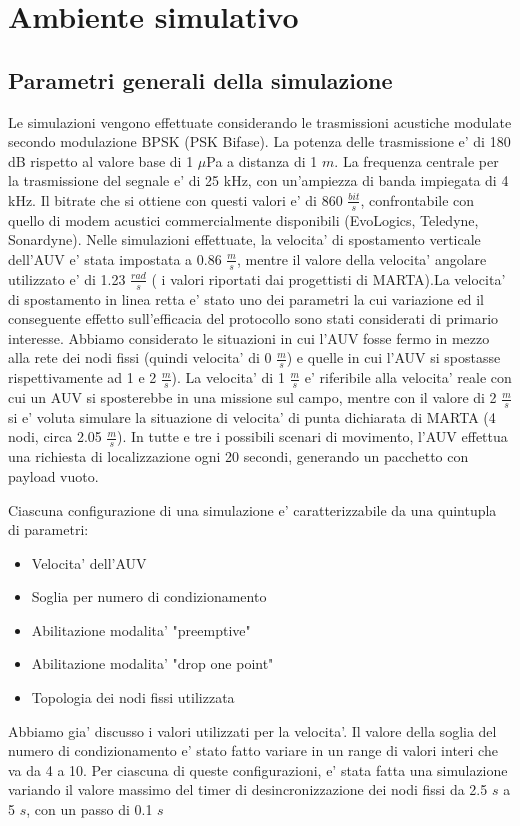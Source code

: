 \documentclass[Lau,binding=0.6cm]{sapthesis}
\begin{document}
\section{Ambiente simulativo}

\subsection{Parametri generali della simulazione}
\par
Le simulazioni vengono effettuate considerando le trasmissioni acustiche modulate secondo modulazione BPSK (PSK Bifase). La potenza delle trasmissione e' di 180 dB rispetto al valore base di 1 $\mu$Pa a distanza di 1 $m$. La frequenza centrale per la trasmissione del segnale e' di 25 kHz, con un'ampiezza di banda impiegata di 4 kHz. Il bitrate che si ottiene con questi valori e' di 860 $\frac{bit}{s}$, confrontabile con quello di modem acustici commercialmente disponibili (EvoLogics, Teledyne, Sonardyne).
Nelle simulazioni effettuate, la velocita' di spostamento verticale dell'AUV e' stata impostata a 0.86 \(\frac{m}{s}\), mentre il valore della velocita' angolare utilizzato e' di 1.23 \(\frac{rad}{s}\) ( i valori riportati dai progettisti di MARTA).\newline La velocita' di spostamento in linea retta e' stato uno dei parametri la cui variazione ed il conseguente effetto sull'efficacia del protocollo sono stati considerati di primario interesse. Abbiamo considerato le situazioni in cui l'AUV fosse fermo in mezzo alla rete dei nodi fissi (quindi velocita' di 0 \(\frac{m}{s}\)) e quelle in cui l'AUV si spostasse rispettivamente ad 1 e 2 \(\frac{m}{s}\)). La velocita' di 1 $\frac{m}{s}$ e' riferibile alla velocita' reale con cui un AUV si sposterebbe in una missione sul campo, mentre con il valore di 2 $\frac{m}{s}$ si e' voluta simulare la situazione di velocita' di punta dichiarata di MARTA (4 nodi, circa 2.05 $\frac{m}{s}$). In tutte e tre i possibili scenari di movimento, l'AUV effettua una richiesta di localizzazione ogni 20 secondi, generando un pacchetto con payload vuoto.
\par
Ciascuna configurazione di una simulazione e' caratterizzabile da una quintupla di parametri:
\begin{itemize}
    \item Velocita' dell'AUV
    \item Soglia per numero di condizionamento
    \item Abilitazione modalita' "preemptive"
    \item Abilitazione modalita' "drop one point"
    \item Topologia dei nodi fissi utilizzata
\end{itemize}
Abbiamo gia' discusso i valori utilizzati per la velocita'. Il valore della soglia del numero di condizionamento e' stato fatto variare in un range di valori interi che va da 4 a 10. Per ciascuna di queste configurazioni, e' stata fatta una simulazione variando il valore massimo del timer di desincronizzazione dei nodi fissi da 2.5 $s$ a 5 $s$, con un passo di 0.1 $s$
\end{document}
